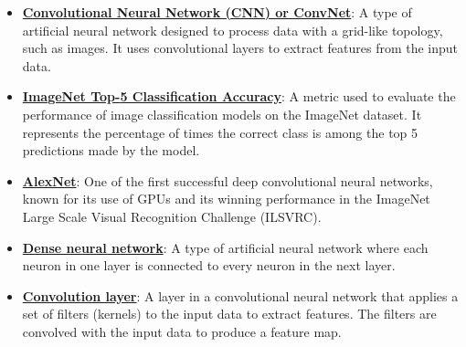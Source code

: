 \documentclass{article}%
\begin{document}
\begin{itemize}[leftmargin=*]%
\item \href{https://purdue.brightspace.com/d2l/common/assets/pdfjs-d2l-dist/1.0.14-legacy/web/viewer.html?file=\%2Fcontent\%2Fenforced\%2F1095467-wl.202510.CS.24300.001\%2F09L1-cnn.pdf\%3Fou\%3D1095467\&lang=en-us\&container=d2l-fileviewer-rendered-pdf\&fullscreen=d2l-fileviewer-rendered-pdf-dialog\&height=667#page=2}{\textbf{Convolutional Neural Network (CNN) or ConvNet}}: A type of artificial neural network designed to process data with a grid-like topology, such as images. It uses convolutional layers to extract features from the input data.%
\item \href{https://purdue.brightspace.com/d2l/common/assets/pdfjs-d2l-dist/1.0.14-legacy/web/viewer.html?file=\%2Fcontent\%2Fenforced\%2F1095467-wl.202510.CS.24300.001\%2F09L1-cnn.pdf\%3Fou\%3D1095467\&lang=en-us\&container=d2l-fileviewer-rendered-pdf\&fullscreen=d2l-fileviewer-rendered-pdf-dialog\&height=667#page=3}{\textbf{ImageNet Top{-}5 Classification Accuracy}}: A metric used to evaluate the performance of image classification models on the ImageNet dataset. It represents the percentage of times the correct class is among the top 5 predictions made by the model.%
\item \href{https://purdue.brightspace.com/d2l/common/assets/pdfjs-d2l-dist/1.0.14-legacy/web/viewer.html?file=\%2Fcontent\%2Fenforced\%2F1095467-wl.202510.CS.24300.001\%2F09L1-cnn.pdf\%3Fou\%3D1095467\&lang=en-us\&container=d2l-fileviewer-rendered-pdf\&fullscreen=d2l-fileviewer-rendered-pdf-dialog\&height=667#page=3}{\textbf{AlexNet}}: One of the first successful deep convolutional neural networks, known for its use of GPUs and its winning performance in the ImageNet Large Scale Visual Recognition Challenge (ILSVRC).%
\item \href{https://purdue.brightspace.com/d2l/common/assets/pdfjs-d2l-dist/1.0.14-legacy/web/viewer.html?file=\%2Fcontent\%2Fenforced\%2F1095467-wl.202510.CS.24300.001\%2F09L1-cnn.pdf\%3Fou\%3D1095467\&lang=en-us\&container=d2l-fileviewer-rendered-pdf\&fullscreen=d2l-fileviewer-rendered-pdf-dialog\&height=667#page=4}{\textbf{Dense neural network}}: A type of artificial neural network where each neuron in one layer is connected to every neuron in the next layer.%
\item \href{https://purdue.brightspace.com/d2l/common/assets/pdfjs-d2l-dist/1.0.14-legacy/web/viewer.html?file=\%2Fcontent\%2Fenforced\%2F1095467-wl.202510.CS.24300.001\%2F09L1-cnn.pdf\%3Fou\%3D1095467\&lang=en-us\&container=d2l-fileviewer-rendered-pdf\&fullscreen=d2l-fileviewer-rendered-pdf-dialog\&height=667#page=6}{\textbf{Convolution layer}}: A layer in a convolutional neural network that applies a set of filters (kernels) to the input data to extract features. The filters are convolved with the input data to produce a feature map.%

\end{itemize}
\end{document}

